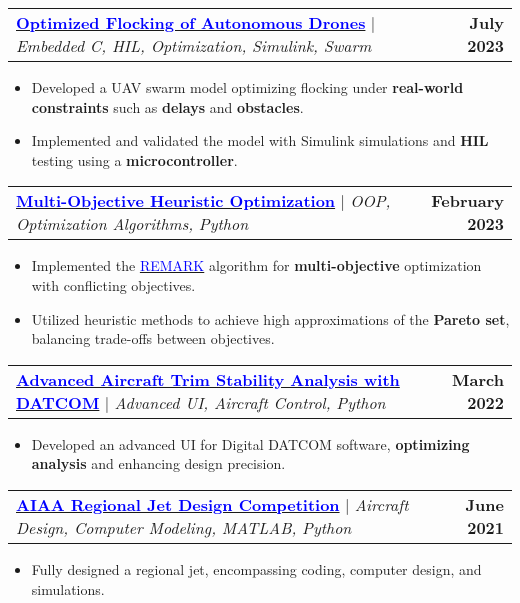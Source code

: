 \documentclass[letterpaper,11pt]{article}
\makeatletter
\newcommand{\resumeItem}[1]{
  \item\small{
    {#1 \vspace{-2pt}}
  }
}
\newcommand{\resumeProjectHeading}[2]{
    \item
    \begin{tabular*}{1.001\textwidth}{l@{\extracolsep{\fill}}r}
      \small#1 & \textbf{\small #2}\\
    \end{tabular*}\vspace{-7pt}
}
\newcommand{\resumeItemListStart}{\begin{itemize}}
\newcommand{\resumeItemListEnd}{\end{itemize}\vspace{-5pt}}
\makeatother
\begin{document}
    \resumeProjectHeading
    {
    	\textbf{\href{https://github.com/alibaniasad1999/Guidance-and-navigation}{\textcolor{blue}{Optimized Flocking of Autonomous Drones}}}
    	$|$ \emph{Embedded C, HIL, Optimization, Simulink, Swarm}}{July 2023}
    \resumeItemListStart
    \resumeItem{Developed a UAV swarm model optimizing flocking under 
    \textbf{real-world constraints}
    such as \textbf{delays} and \textbf{obstacles}.}
    \resumeItem{Implemented and validated the model with Simulink simulations and \textbf{HIL} testing using a \textbf{microcontroller}.}
    \resumeItemListEnd

          \vspace{-18pt}
          \resumeProjectHeading
          {\textbf{\href{https://github.com/alibaniasad1999/Heuristic-optimization-algorithms}{\textcolor{blue}{Multi-Objective Heuristic Optimization}}} $|$ \emph{OOP, Optimization Algorithms, Python}}{February 2023}
          \resumeItemListStart
          \resumeItem{Implemented the 
          	\href{https://link.springer.com/article/10.1007/s12652-022-04332-8}{\textcolor{blue}{REMARK}}
          	algorithm for \textbf{multi-objective} optimization with conflicting objectives.}
          \resumeItem{Utilized heuristic methods to achieve high approximations of the \textbf{Pareto set}, balancing trade-offs between objectives.}
          \resumeItemListEnd
		
          
          \vspace{-18pt}
          
          
          \resumeProjectHeading
          {
          	\textbf{\href{https://github.com/alibaniasad1999/DATCOM-Trim-Diagram-GUI}{\textcolor{blue}{Advanced Aircraft Trim Stability Analysis with DATCOM}}}
          	$|$ \emph{Advanced UI, Aircraft Control, Python}}{March 2022}
          \resumeItemListStart
          \resumeItem{Developed an advanced UI for Digital DATCOM software, \textbf{optimizing analysis} and enhancing design precision.}
          
          \resumeItemListEnd
          
          
          
          \vspace{-18pt}
          \resumeProjectHeading
          {
          	\textbf{\href{https://github.com/alibaniasad1999/Airplane-Design-II}{\textcolor{blue}{AIAA Regional Jet Design Competition}}}
          	$|$ \emph{Aircraft Design, Computer Modeling, MATLAB, Python}}{June 2021}
          \resumeItemListStart
          \resumeItem{Fully designed a regional jet, encompassing coding, computer design, and simulations.}
          \resumeItemListEnd
          
\end{document}
